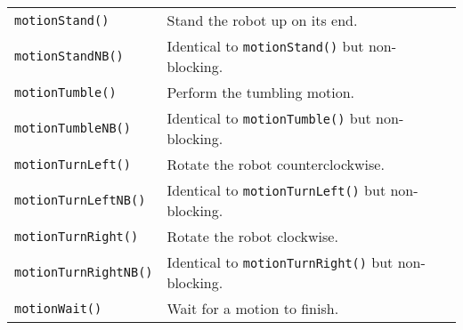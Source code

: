 \begin{table}[!h]
\begin{center}
\begin{tabular}{p{38 mm}p{107 mm}}
\texttt{motionStand()} \dotfill & Stand the robot up on its end. \\
\texttt{motionStandNB()} \dotfill & Identical to \texttt{motionStand()} but non-blocking. \\
\texttt{motionTumble()} \dotfill & Perform the tumbling motion. \\
\texttt{motionTumbleNB()} \dotfill & Identical to \texttt{motionTumble()} but non-blocking. \\
\texttt{motionTurnLeft()} \dotfill & Rotate the robot counterclockwise. \\
\texttt{motionTurnLeftNB()} \dotfill & Identical to \texttt{motionTurnLeft()} but non-blocking. \\
\texttt{motionTurnRight()} \dotfill & Rotate the robot clockwise. \\
\texttt{motionTurnRightNB()} \dotfill & Identical to \texttt{motionTurnRight()} but non-blocking. \\
\texttt{motionWait()} \dotfill & Wait for a motion to finish. \\
\hline
\end{tabular}
\end{center}
\label{mobilec_api_compound}
\end{table}

\clearpage
\newpage




%
































%







